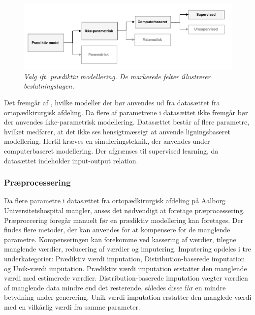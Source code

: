 \begin{figure}[H]
	\centering
	\includegraphics[scale=.5]{figures/praediktivmodel.png}
	\caption{\textit{Valg ift. prædiktiv modellering. De markerede felter illustrerer beslutningstagen.}}
	\label{praediktiv}
\end{figure}

\noindent 
Det fremgår af , hvilke modeller der bør anvendes ud fra datasættet fra ortopædkirurgisk afdeling.
Da flere af parametrene i datasættet ikke fremgår bør der anvendes ikke-parametrisk modellering. Datasættet består af flere parametre, hvilket medfører, at det ikke ses hensigtmæssigt at anvende ligningsbaseret modellering. Hertil kræves en simuleringsteknik, der anvendes under computerbaseret modellering. Der afgrænses til supervised learning, da datasættet indeholder input-output relation.


\subsubsection{Præprocessering}
Da flere parametre i datasættet fra ortopædkirurgisk afdeling på Aalborg Universitetshospital mangler, anses det nødvendigt at foretage præprocessering. Præproccering foregår manuelt før en prædiktiv modellering kan foretages.
Der findes flere metoder, der kan anvendes for at kompensere for de manglende parametre. Kompenseringen kan forekomme ved kassering af værdier, tilegne manglende værdier, reducering af værdier og imputering. Imputering opdeles i tre underkategorier: Prædiktiv værdi imputation, Distribution-baserede imputation og Unik-værdi imputation. Prædiktiv værdi imputation erstatter den manglende værdi med estimerede værdier. Distribution-baserede imputation vægter værdien af manglende data mindre end det resterende, således disse får en mindre betydning under generering. Unik-værdi imputation  erstatter den manglede værdi med en vilkårlig værdi fra samme parameter.\cite{Saar2007} 


